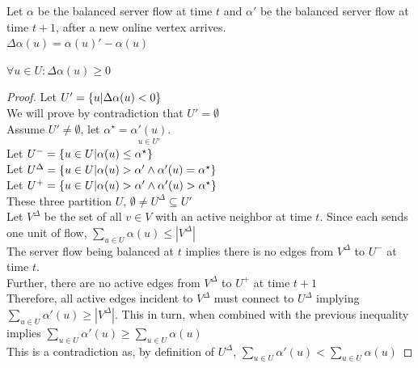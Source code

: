 Let $\alpha$ be the balanced server flow at time $t$ and $\alpha'$ be the balanced server flow at time $t+1$, after a new online vertex arrives.\\
$\Delta\alpha(u)=\alpha(u)'-\alpha(u)$
\begin{lemma}
	\label{balanced-sf-insert}
	$\forall u\in U:\Delta\alpha(u)\geq 0$
\end{lemma}
\begin{proof}
	Let $U'=\{u|\Delta\alpha(u)<0\}$\\
	We will prove by contradiction that $U'=\emptyset$\\
	Assume $U'\neq\emptyset$, let $\alpha^\star=\underset{u\in U'}{\alpha'(u)}$.\\
	Let $U^-=\{u\in U|\alpha(u)\leq\alpha^\star\}$\\
	Let $U^\Delta=\{u\in U|\alpha(u)>\alpha'\land\alpha'(u)=\alpha^\star\}$\\
	Let $U^+=\{u\in U|\alpha(u)>\alpha'\land\alpha'(u)>\alpha^\star\}$\\
	These three partition $U$, $\emptyset\neq U^\Delta\subseteq U'$\\
	Let $V^\Delta$ be the set of all $v\in V$ with an active neighbor at time $t$. Since each sends one unit of flow, $\sum\limits_{u\in U}\alpha(u)\leq|V^\Delta|$\\
	The server flow being balanced at $t$ implies there is no edges from $V^\Delta$ to $U^-$ at time $t$.\\
	Further, there are no active edges from $V^\Delta$ to $U^+$ at time $t+1$\\
	Therefore, all active edges incident to $V^\Delta$ must connect to $U^\Delta$ implying $\sum\limits_{u\in U}\alpha'(u)\geq|V^\Delta|$.
	This in turn, when combined with the previous inequality implies $\sum\limits_{u\in U}\alpha'(u)\geq \sum\limits_{u\in U}\alpha(u)$\\
	This is a contradiction as, by definition of $U^\Delta$, $\sum\limits_{u\in U}\alpha'(u)< \sum\limits_{u\in U}\alpha(u)$ 
\end{proof}

